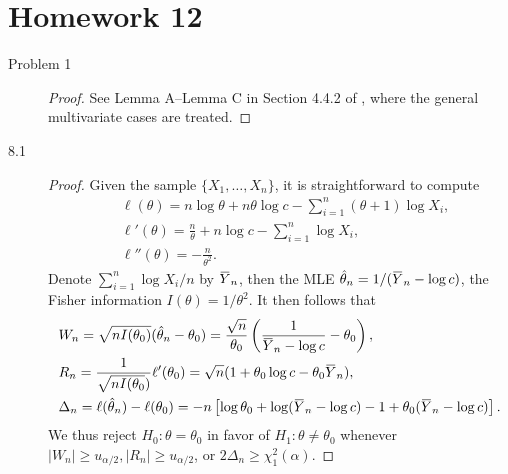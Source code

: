 \documentclass{article}
\newcommand{\overbar}[1]{\mkern 1.5mu\overline{\mkern-1.5mu#1\mkern-1.5mu}\mkern 1.5mu}
\theoremstyle{definition}
\theoremstyle{plain}
\theoremstyle{remark}
\begin{document}
\newpage
\section*{Homework 12}
\begin{description}
\item[Problem 1]
\begin{proof}
See Lemma A--Lemma C in Section 4.4.2 of \cite{serfling1980approximation}, where 
the general multivariate cases are treated. 
\end{proof}
\item[8.1]
\begin{proof}
Given the sample $\{X_1, \ldots, X_n\}$, it is straightforward to compute
\begin{align*}
    & \ell(\theta) = n\log\theta + n\theta\log c - \sum_{i = 1}^n(\theta + 1)\log X_i, \\
    & \ell'(\theta) = \frac{n}{\theta} + n\log c - \sum_{i = 1}^n \log X_i, \\
    & \ell''(\theta) = -\frac{n}{\theta^2}.
\end{align*}
Denote $\sum_{i = 1}^n \log X_i/n$ by $\overbar{Y}_n$, then the MLE 
$\hat{\theta}_n = 1/(\overbar{Y}_n - \log c)$, the Fisher information $I(\theta) = 
1/\theta^2$. It then follows that
\begin{align*}
    & W_n = \sqrt{nI(\theta_0)}(\hat{\theta}_n - \theta_0) = \frac{\sqrt{n}}{\theta_0}
    \left(\frac{1}{\overbar{Y}_n - \log c} - \theta_0\right), \\
    & R_n = \frac{1}{\sqrt{nI(\theta_0})}\ell'(\theta_0) = \sqrt{n}(1 + \theta_0\log c - \theta_0
    \overbar{Y}_n), \\
    & \Delta_n = \ell(\hat{\theta}_n) - \ell(\theta_0) = -n\left[\log\theta_0 + 
    \log(\overbar{Y}_n - \log c) - 1 + \theta_0(\overbar{Y}_n - \log c)\right].
\end{align*}
We thus reject $H_0: \theta = \theta_0$ in favor of $H_1: \theta \neq \theta_0$ whenever
$|W_n| \geq u_{\alpha/2}, |R_n| \geq u_{\alpha/2}$, or $2\Delta_n \geq \chi_1^2(\alpha)$.
\end{proof}


\end{description}
\end{document}
